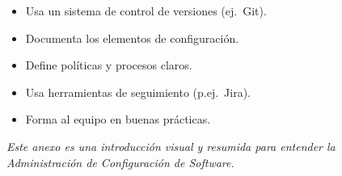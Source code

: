 \documentclass[a4paper,11pt]{report}
\begin{document}
\begin{multicols}{2}
        \vspace{0.5em}

        \begin{cajaroja}
            \begin{itemize}[leftmargin=*]
                \item Usa un sistema de control de versiones (ej.\ Git).
                \item Documenta los elementos de configuración.
                \item Define políticas y procesos claros.
                \item Usa herramientas de seguimiento (p.ej.\ Jira).
                \item Forma al equipo en buenas prácticas.
            \end{itemize}
        \end{cajaroja}

    \end{multicols}

    \vspace{1em}
    \begin{center}
        \small\textit{Este anexo es una introducción visual y resumida para entender la Administración de Configuración de Software.}
    \end{center}
\end{document}
